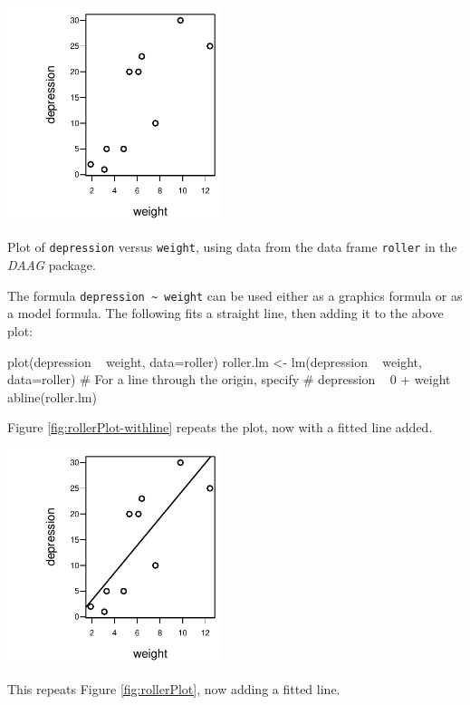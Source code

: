 \documentclass{tufte-book}\usepackage[]{graphicx}\usepackage[]{color}
\newcommand{\txtt}[1]{\texttt{#1}}
\begin{document}
\begin{marginfigure}
\begin{Schunk}


\centerline{\includegraphics[width=0.47\textwidth]{figs/11-plt-roller-1} }

\end{Schunk}
  \caption{Plot of \txtt{depression} versus \txtt{weight}, using data
from the data frame \txtt{roller} in the {\em DAAG}
package.}\label{fig:rollerPlot}
\end{marginfigure}

The formula \verb!depression ~ weight! can be used either as a
graphics formula or as a model formula. The following
fits a straight line, then adding it to the above plot:
\begin{Schunk}
\begin{Sinput}
plot(depression ~ weight, data=roller)
roller.lm <- lm(depression ~ weight, data=roller)
# For a line through the origin, specify
# depression ~ 0 + weight
abline(roller.lm)
\end{Sinput}
\end{Schunk}
Figure \ref{fig:rollerPlot-withline} repeats the plot, now with a
fitted line added.

\begin{marginfigure}
\begin{Schunk}


\centerline{\includegraphics[width=0.47\textwidth]{figs/11-pltWline-1} }

\end{Schunk}
\caption{This repeats Figure \ref{fig:rollerPlot}, now adding a fitted
  line.}\label{fig:rollerPlot-withline}
\end{marginfigure}
\end{document}
